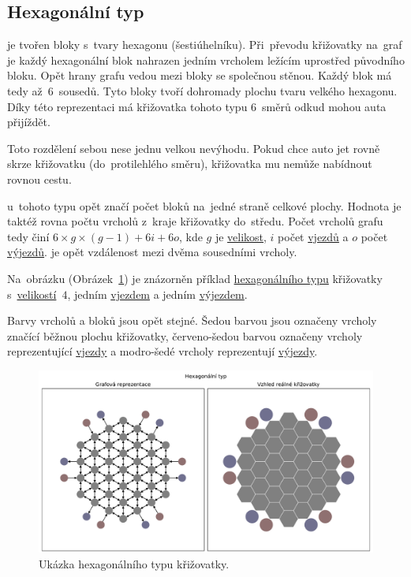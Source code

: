\subsection{Hexagonální typ}\label{subsec:hexagonalni_typ}

 je tvořen bloky s~tvary hexagonu (šestiúhelníku).
Při~převodu křižovatky na~graf je každý hexagonální blok nahrazen jedním vrcholem ležícím uprostřed původního bloku.
Opět hrany grafu vedou mezi bloky se společnou stěnou.
Každý blok má tedy až~$6$~sousedů.
Tyto bloky tvoří dohromady plochu tvaru velkého hexagonu.
Díky této reprezentaci má křižovatka tohoto typu $6$~směrů odkud mohou auta přijíždět.

Toto rozdělení sebou nese jednu velkou nevýhodu.
Pokud chce auto jet rovně skrze křižovatku (do~protilehlého směru), křižovatka mu nemůže nabídnout rovnou cestu.

 u~tohoto typu opět značí počet bloků na~jedné straně celkové plochy.
Hodnota je taktéž rovna počtu vrcholů z~kraje křižovatky do~středu.
Počet vrcholů grafu tedy činí $6 \times g \times (g-1) + 6i + 6o$,
kde $g$ je \hyperref[par:velikost_krizovatky]{velikost},
$i$ počet \hyperref[par:vjezdy]{vjezdů} a $o$ počet \hyperref[par:vyjezdy]{výjezdů}.
 je opět vzdálenost mezi dvěma sousedními vrcholy.

Na~obrázku (Obrázek~\ref{fig:hexagonal_type_graph}) je znázorněn příklad
\hyperref[subsec:hexagonalni_typ]{hexagonálního typu} křižovatky s~\hyperref[par:velikost_krizovatky]{velikostí}~$4$,
jedním \hyperref[par:vjezdy]{vjezdem} a jedním \hyperref[par:vyjezdy]{výjezdem}.

Barvy vrcholů a bloků jsou opět stejné.
Šedou barvou jsou označeny vrcholy značící běžnou plochu křižovatky,
červeno-šedou barvou označeny vrcholy reprezentující \hyperref[par:vjezdy]{vjezdy} a
modro-šedé vrcholy reprezentují \hyperref[par:vyjezdy]{výjezdy}.

\begin{figure}[h]
	\centering
	\includegraphics[width=\textwidth]{../img/Hexagonal_grid}
	\caption{Ukázka hexagonálního typu křižovatky.}
	\label{fig:hexagonal_type_graph}
\end{figure}
